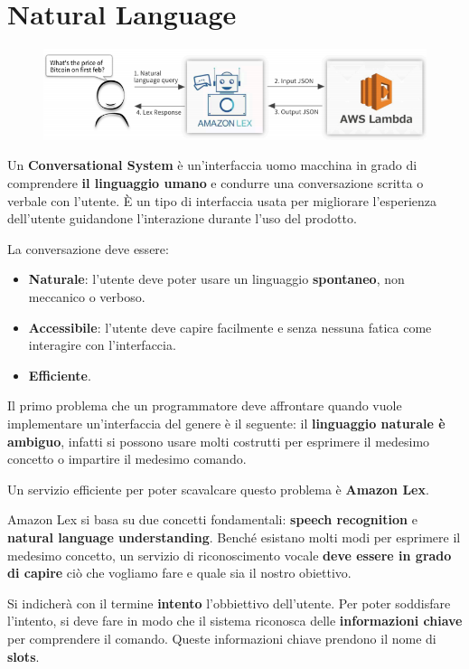 
\chapter{Natural Language}

\begin{figure}[!h]
	\includegraphics[scale=0.5]{../immagini/Natural_language.png}
\end{figure}

Un \textbf{Conversational System} è un'interfaccia uomo macchina in grado di comprendere \textbf{il linguaggio umano} e condurre una conversazione scritta o verbale con l'utente. È un tipo di interfaccia usata per migliorare l'esperienza dell'utente guidandone l'interazione durante l'uso del prodotto.

La conversazione deve essere:
\begin{itemize}
	\item \textbf{Naturale}: l'utente deve poter usare un linguaggio \textbf{spontaneo}, non meccanico o verboso.
	\item \textbf{Accessibile}: l'utente deve capire facilmente e senza nessuna fatica come interagire con l'interfaccia.
	\item \textbf{Efficiente}.
\end{itemize}

Il primo problema che un programmatore deve affrontare quando vuole implementare un'interfaccia del genere è  il seguente: il \textbf{linguaggio naturale è ambiguo}, infatti si possono usare molti costrutti per esprimere il medesimo concetto o impartire il medesimo comando.

Un servizio efficiente per poter scavalcare questo problema è \textbf{Amazon Lex}.

Amazon Lex si basa su due concetti fondamentali: \textbf{speech recognition} e \textbf{natural language understanding}.
Benché esistano molti modi per esprimere il medesimo concetto, un servizio di riconoscimento vocale \textbf{deve essere in grado di capire} ciò che vogliamo fare e quale sia il nostro obiettivo.

Si indicherà con il termine \textbf{intento} l'obbiettivo dell'utente.
Per poter soddisfare l'intento, si deve fare in modo che il sistema riconosca delle \textbf{informazioni chiave} per comprendere il comando. Queste informazioni chiave prendono il nome di \textbf{slots}.

